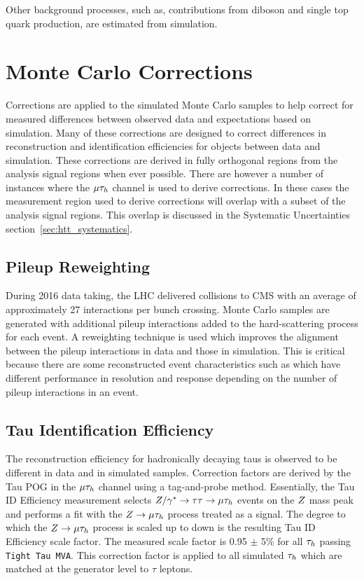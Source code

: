 Other background processes, such as, contributions from diboson and single top quark production, are estimated 
from simulation.


\section{Monte Carlo Corrections}
\label{sec:mc_corrections}

Corrections are applied to the simulated Monte Carlo samples to help correct for measured differences
between observed data and expectations based on simulation. Many of these corrections are designed
to correct differences in reconstruction and identification efficiencies for objects between data
and simulation. These corrections are derived in
fully orthogonal regions from the analysis signal regions when ever possible. There are however a
number of
instances where the $\mu\tau_{h}$ channel is used to derive corrections. In these cases the measurement
region used to derive corrections will overlap with a subset of the analysis signal regions. This
overlap is discussed in the Systematic Uncertainties section~\ref{sec:htt_systematics}.


\subsection{Pileup Reweighting}
During 2016 data taking, the LHC delivered \pp collisions to CMS with an average of approximately 27
interactions per bunch crossing. Monte Carlo samples are generated with additional pileup interactions
added to the hard-scattering process for each event. A reweighting technique is used which improves
the alignment between the pileup interactions in data and those in simulation. This is critical because
there are some reconstructed event characteristics such as \etvecmiss which have different performance
in resolution and response depending on the number of pileup interactions in an event.


\subsection{Tau Identification Efficiency}
\label{sec:htt_tau_id_eff}
The reconstruction efficiency for hadronically decaying taus is observed to be different in data and in simulated samples.
Correction factors are derived by the Tau POG in the $\mu\tau_{h}$ channel using a tag-and-probe method. Essentially,
the Tau ID Efficiency measurement selects $Z/\gamma^*\to\tau\tau\to\mu\tau_{h}$ events on the $Z$
mass peak and performs a fit with the $Z\to\mu\tau_{h}$ process treated as a signal. The degree
to which the $Z\to\mu\tau_{h}$ process is scaled up to down is the resulting Tau ID Efficiency
scale factor. The measured scale factor is 0.95 $\pm$ 5\% for all $\tau_{h}$ passing \texttt{Tight Tau MVA}.
This correction factor is applied to all simulated $\tau_{h}$ which are matched at the generator
level to $\tau$ leptons.


